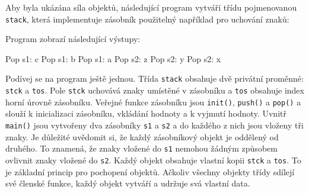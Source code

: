     \begin{example}\label{stack1}
      Aby byla ukázána síla objektů, následující program vytváří třídu pojmenovanou \lstinline[basicstyle=\ttfamily]!stack!,
      která implementuje zásobník použitelný například pro uchování znaků:
      
      Program zobrazí následující výstupy:
      \begin{center}
      Pop s1: c\linebreak
      Pop s1: b\linebreak
      Pop s1: a\linebreak
      Pop s2: z\linebreak
      Pop s2: y\linebreak
      Pop s2: x
      \end{center}

      Podívej se na program ještě jednou. Třída \lstinline[basicstyle=\ttfamily]!stack! obsahuje dvě privátní proměnné:
      \lstinline[basicstyle=\ttfamily]!stck! a \lstinline[basicstyle=\ttfamily]!tos!. Pole \lstinline[basicstyle=\ttfamily]!stck!
      uchovává znaky umístěné v zásobníku a \lstinline[basicstyle=\ttfamily]!tos! obsahuje index horní úrovně zásobníku. Veřejné
      funkce zásobníku jsou \lstinline[basicstyle=\ttfamily]!init()!, \lstinline[basicstyle=\ttfamily]!push()! a
      \lstinline[basicstyle=\ttfamily]!pop()! a slouží k inicializaci zásobníku, vkládání hodnoty a k vyjmutí hodnoty.
      Uvnitř \lstinline[basicstyle=\ttfamily]!main()! jsou vytvořeny dva zásobníky \lstinline[basicstyle=\ttfamily]!s1! a
      \lstinline[basicstyle=\ttfamily]!s2! a do každého z nich jsou vloženy tři znaky. Je důležité uvědomit si, že každý
      zásobníkový objekt je oddělený od druhého. To znamená, že znaky vložené do \lstinline[basicstyle=\ttfamily]!s1! nemohou
      žádným způsobem ovlivnit znaky vložené do \lstinline[basicstyle=\ttfamily]!s2!. Každý objekt obsahuje vlastní kopii
      \lstinline[basicstyle=\ttfamily]!stck! a \lstinline[basicstyle=\ttfamily]!tos!. To je základní princip pro pochopení
      objektů. Ačkoliv všechny objekty třídy sdílejí své členské funkce, každý objekt vytváří a udržuje svá vlastní data.
    \end{example}	

